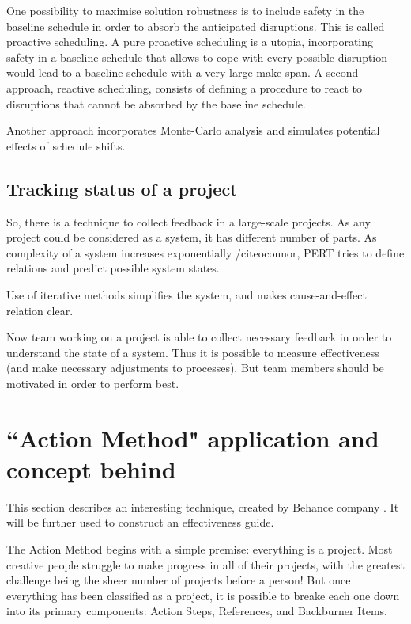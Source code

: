 One possibility to maximise solution robustness is to include safety in the baseline schedule in order to absorb the anticipated disruptions. This is called proactive scheduling. A pure proactive scheduling is a utopia, incorporating safety in a baseline schedule that allows to cope with every possible disruption would lead to a baseline schedule with a very large make-span. A second approach, reactive scheduling, consists of defining a procedure to react to disruptions that cannot be absorbed by the baseline schedule.

Another approach incorporates Monte-Carlo analysis and simulates potential effects of schedule shifts.

\subsection{Tracking status of a project}

So, there is a technique to collect feedback in a large-scale projects. As any project could be considered as a system, it has different number of parts. As complexity of a system increases exponentially /cite{oconnor}, PERT tries to define relations and predict possible system states.

Use of iterative methods simplifies the system, and makes cause-and-effect relation clear.

Now team working on a project is able to collect necessary feedback in order to understand the state of a system. Thus it is possible to measure effectiveness (and make necessary adjustments to processes). But team members should be motivated in order to perform best.

\section{``Action Method" application and concept behind}

This section describes an interesting technique, created by Behance company \cite{belsky}. It will be further used to construct an effectiveness guide.

The Action Method begins with a simple premise: everything is a project. Most creative people struggle to make progress in all of their projects, with the greatest challenge being the sheer number of projects before a person! But once everything has been classified as a project, it is possible to breake each one down into its primary components: Action Steps, References, and Backburner Items.

